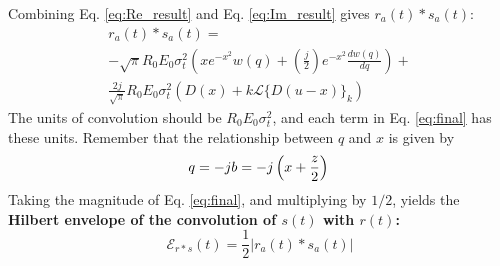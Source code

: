 \documentclass[amsmath,amssymb,aps,prd,10pt,twocolumn,showkeys]{revtex4}
\begin{document}
Combining Eq. \ref{eq:Re_result} and Eq. \ref{eq:Im_result} gives $r_a(t) * s_a(t)$:
\begin{multline}
r_a(t) * s_a(t) = \\ -\sqrt{\pi} R_0 E_0 \sigma_t^2 \left(x e^{-x^2} w(q) + \left(\frac{j}{2}\right) e^{-x^2} \frac{dw(q)}{dq} \right) + \\ \frac{2j}{\sqrt{\pi}} R_0 E_0 \sigma_t^2 \left(D(x) + k\mathcal{L}\lbrace D(u-x)\rbrace_k\right) \label{eq:final}
\end{multline}
The units of convolution should be $R_0 E_0\sigma_t^2$, and each term in Eq. \ref{eq:final} has these units.  Remember that the relationship between $q$ and $x$ is given by
\begin{equation}
q = -jb = -j\left(x + \frac{z}{2}\right) \\
\end{equation}
Taking the magnitude of Eq. \ref{eq:final}, and multiplying by $1/2$, yields the \textbf{Hilbert envelope of the convolution of $s(t)$ with $r(t)$:}
\begin{equation}
\mathcal{E}_{r * s}(t) = \frac{1}{2} | r_a(t) * s_a(t) | \label{eq:final2}
\end{equation}
\end{document}
